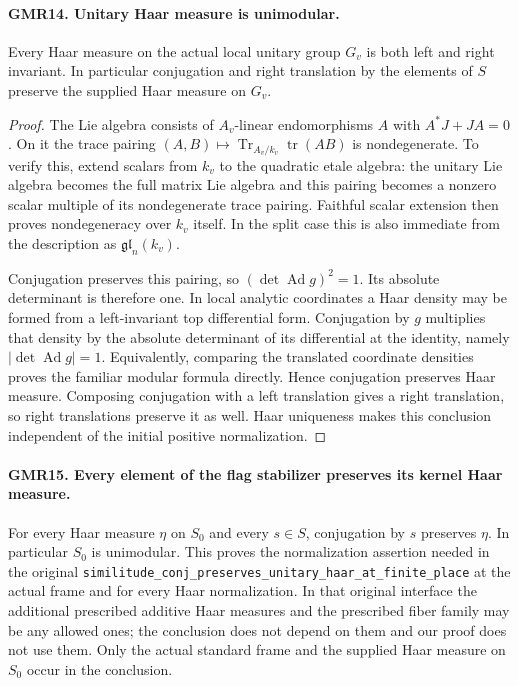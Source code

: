 \documentclass[11pt,a4paper]{article}
\numberwithin{equation}{section}
\theoremstyle{remark}\newtheorem{remark}[theorem]{Remark}
\begin{document}
\paragraph{GMR14. Unitary Haar measure is unimodular.}
\label{claim:GMR14}
Every Haar measure on the actual local unitary group $G_v$ is both
left and right invariant.  In particular conjugation and right
translation by the elements of $S$ preserve the supplied Haar measure
on $G_v$.

\begin{proof}
The Lie algebra consists of $A_v$-linear endomorphisms $A$ with
$A^*J+JA=0$.  On it the trace pairing
$(A,B)\mapsto\operatorname{Tr}_{A_v/k_v}\operatorname{tr}(AB)$ is
nondegenerate.  To verify this, extend scalars from $k_v$ to the
quadratic etale algebra: the unitary Lie algebra becomes the full
matrix Lie algebra and this pairing becomes a nonzero scalar
multiple of its nondegenerate trace pairing.  Faithful scalar
extension then proves nondegeneracy over $k_v$ itself.  In the split
case this is also immediate from the description as
$\mathfrak{gl}_n(k_v)$.

Conjugation preserves this pairing, so
$(\det\operatorname{Ad}g)^2=1$.  Its absolute determinant is therefore
one.  In local analytic coordinates a Haar density may be formed
from a left-invariant top differential form.  Conjugation by $g$
multiplies that density by the absolute determinant of its
differential at the identity, namely
$|\det\operatorname{Ad}g|=1$.
Equivalently, comparing the translated coordinate densities proves
the familiar modular formula directly.  Hence conjugation preserves
Haar measure.  Composing conjugation with a left translation gives
a right translation, so right translations preserve it as well.
Haar uniqueness makes this conclusion independent of the initial
positive normalization.
\end{proof}

\paragraph{GMR15. Every element of the flag stabilizer preserves its kernel Haar measure.}
\label{claim:GMR15}
For every Haar measure $\eta$ on $S_0$ and every $s\in S$,
conjugation by $s$ preserves $\eta$.  In particular $S_0$ is
unimodular.  This proves the normalization assertion needed in the
original \texttt{similitude\_\allowbreak conj\_\allowbreak preserves\_\allowbreak unitary\_\allowbreak haar\_\allowbreak at\_\allowbreak finite\_\allowbreak place}
at the actual frame and for every Haar normalization.
In that original interface the additional prescribed additive Haar
measures and the prescribed fiber family may be any allowed ones;
the conclusion does not depend on them and our proof does not use
them.  Only the actual standard frame and the supplied Haar measure
on $S_0$ occur in the conclusion.
\end{document}

